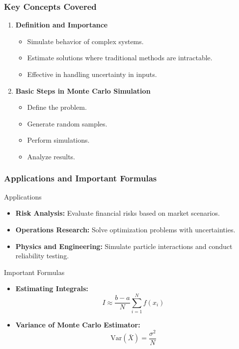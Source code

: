 \documentclass[aspectratio=169]{beamer}
\begin{document}
\begin{frame}[fragile]
    \frametitle{Key Concepts Covered}
    \begin{enumerate}
        \item \textbf{Definition and Importance}
        \begin{itemize}
            \item Simulate behavior of complex systems.
            \item Estimate solutions where traditional methods are intractable.
            \item Effective in handling uncertainty in inputs.
        \end{itemize}

        \item \textbf{Basic Steps in Monte Carlo Simulation}
        \begin{itemize}
            \item Define the problem.
            \item Generate random samples.
            \item Perform simulations.
            \item Analyze results.
        \end{itemize}
    \end{enumerate}
\end{frame}

\begin{frame}[fragile]
    \frametitle{Applications and Important Formulas}
    \begin{block}{Applications}
        \begin{itemize}
            \item \textbf{Risk Analysis:} Evaluate financial risks based on market scenarios.
            \item \textbf{Operations Research:} Solve optimization problems with uncertainties.
            \item \textbf{Physics and Engineering:} Simulate particle interactions and conduct reliability testing.
        \end{itemize}
    \end{block}

    \begin{block}{Important Formulas}
        \begin{itemize}
            \item \textbf{Estimating Integrals:}
            \begin{equation}
            I \approx \frac{b-a}{N} \sum_{i=1}^{N} f(x_i)
            \end{equation}
            \item \textbf{Variance of Monte Carlo Estimator:}
            \begin{equation}
            \text{Var}(\bar{X}) = \frac{\sigma^2}{N}
            \end{equation}
        \end{itemize}
    \end{block}
\end{frame}
\end{document}
